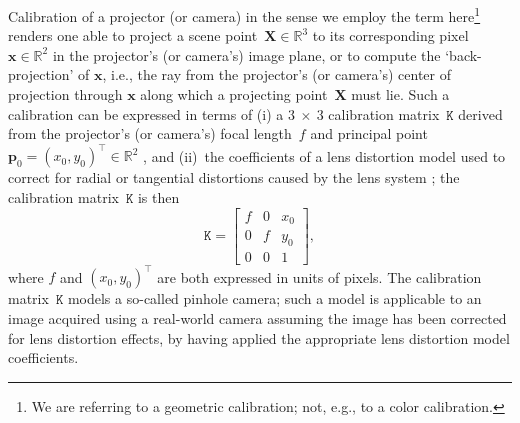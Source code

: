 \documentclass[review]{elsarticle}
\begin{document}
Calibration of a projector (or camera) in the sense we employ the term here\footnote{We are referring to a geometric calibration; not, e.g., to a color calibration.} renders one able to project a scene point~$\mathbf{X} \in \mathbb{R}^3$ to its corresponding pixel~$\mathbf{x} \in \mathbb{R}^2$ in the projector's (or camera's) image plane, or to compute the `back-projection' of $\mathbf{x}$, i.e., the ray from the projector's (or camera's) center of projection through $\mathbf{x}$ along which a projecting point~$\mathbf{X}$ must lie. Such a calibration can be expressed in terms of (i) a $3~\times{}~3$ calibration matrix~$\mathtt{K}$ derived from the projector's (or camera's) focal length~$f$ and principal point~$\mathbf{p}_0 = (x_0, y_0)^\top \in \mathbb{R}^2$ \cite{Hartley2004}, and (ii)~the coefficients of a lens distortion model used to correct for radial or tangential distortions caused by the lens system \cite{duane1971close,weng1992camera}; the calibration matrix~$\mathtt{K}$ is then
\begin{equation}
\mathtt{K} = \begin{bmatrix}
f & 0 & x_0 \\
0 & f & y_0 \\
0 & 0 & 1
\end{bmatrix},
\end{equation}
where $f$ and $(x_0, y_0)^\top$ are both expressed in units of pixels. The calibration matrix~$\mathtt{K}$ models a so-called pinhole camera; such a model is applicable to an image acquired using a real-world camera assuming the image has been corrected for lens distortion effects, by having applied the appropriate lens distortion model coefficients.
\end{document}
